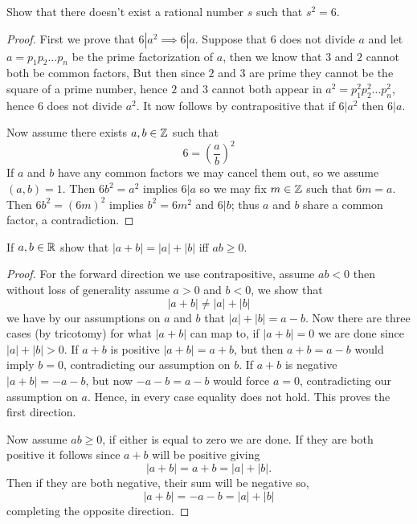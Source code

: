 

\maketitle


\question
Show that there doesn't exist a rational number $s$ such that $s^2 = 6$. 


\begin{proof}
    First we prove that $6|a^2 \implies 6|a$. Suppose that $6$ does not divide $a$ and let $a = p_1p_2 \dots p_n$ 
    be the prime factorization of $a$, then we know that $3$ and $2$ cannot both be common factors,  
    But then since $2$ and $3$ are prime they cannot be the square of a prime number, hence $2$ and $3$ cannot both 
    appear in $a^2 = p_1^2 p_2^2 \dots p_n^2$, hence $6$ does not divide $a^2$. It now follows by contrapositive that 
    if $6|a^2$ then $6|a$. 

    Now assume there exists $a, b \in \mathbb{Z}$ such that 
    \[6 = \left(\frac{a}{b}\right)^2 \]
    If $a$ and $b$ have any common factors we may cancel them out, so we assume $(a, b) = 1$. 
    Then $6b^2 = a^2$ implies $6|a$ so we may fix $m \in \mathbb{Z}$ such that $6m = a$. Then 
    $6b^2 = (6m)^2$ implies $b^2 = 6m^2$ and $6|b$; thus $a$ and $b$ share a common factor, 
    a contradiction. 

\end{proof}

\question
If $a, b \in \mathbb{R}$ show that $|a + b| = |a| + |b| $ iff $ab \geq 0$. 


\begin{proof}
    For the forward direction we use contrapositive, assume $ab < 0$ then without loss of generality assume $a > 0$ and $b<0$, we show that 
    \[|a +b | \neq |a| + |b| \] 
    we have by our assumptions on $a$ and $b$ that $|a| + |b| = a - b$. 
    Now there are three cases (by tricotomy) for what $|a+b|$ can map to, if $|a + b| = 0$
    we are done since $| a| + |b| > 0$. 
    If $a + b$ is positive $|a + b| = a + b$, but then $a + b = a - b$ would imply $b = 0$, contradicting our assumption on $b$.
    If $a + b$ is negative $|a + b| = -a -b$, but now $-a -b = a - b$ would force $a = 0$, contradicting our assumption on $a$. 
    Hence, in every case equality does not hold. This proves the first direction.
    
    Now assume $ab \geq 0$, if either is equal to zero we are done. If they are both positive it follows since $a + b$ will be positive giving 
    \[|a + b| = a + b = |a| + |b|.\]
    Then if they are both negative, their sum will be negative so,
    \[|a + b| = -a - b = |a| + |b|\]
    completing the opposite direction. 
\end{proof}

